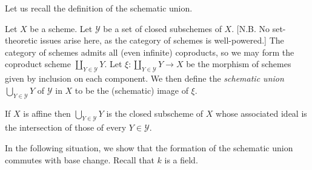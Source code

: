 \documentclass[twoside,a4paper,reqno,11pt]{amsart}
\theoremstyle{definition}
\begin{document}
\vspace{2mm}\noindent Let us recall the definition of the schematic union.

\vspace{2mm}\noindent Let $X$ be a scheme. Let $\mathcal{Y}$ be a set of closed subschemes of $X$. [N.B. No set-theoretic issues arise here, as the category of schemes is well-powered.] The category of schemes admits all (even infinite) coproducts, so we may form the coproduct scheme $\coprod_{Y\in\mathcal{Y}} Y$. Let $\xi:\coprod_{Y\in\mathcal{Y}} Y \to X$ be the morphism of schemes given by inclusion on each component. We then define the \textit{schematic union} $\bigcup_{Y\in\mathcal{Y}}Y$ of $\mathcal{Y}$ in $X$ to be the (schematic) image of $\xi$.

\vspace{2mm}\noindent If $X$ is affine then $\bigcup_{Y\in\mathcal{Y}}Y$ is the closed subscheme of $X$ whose associated ideal is the intersection of those of every $Y\in\mathcal{Y}$. %

\vspace{2mm}\noindent In the following situation, we show that the formation of the schematic union commutes with base change. Recall that $k$ is a field.
\end{document}
